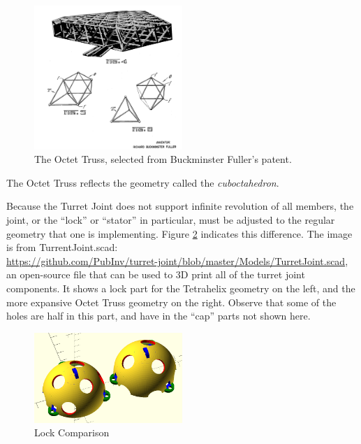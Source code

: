 \documentclass[11pt]{article}
\begin{document}
\begin{figure}[H]
  \centering
    \includegraphics[width=0.5\textwidth]{figures/OctetTrussSelection.png}
    \caption[The Octet Truss]{The Octet Truss, selected from Buckminster Fuller's patent.}
      \label{octet-truss-patent}
\end{figure}

The Octet Truss reflects the geometry called the \emph{cuboctahedron}.

Because the Turret Joint does not support infinite revolution of all members, the joint, or the ``lock'' or ``stator'' in particular,
must be adjusted to the regular geometry that one is implementing.  Figure \ref{lockcomparison} indicates this difference.
The image is from TurrentJoint.scad:\\
\href{https://github.com/PubInv/turret-joint/blob/master/Models/TurretJoint.scad}{https://github.com/PubInv/turret-joint/blob/master/Models/TurretJoint.scad}, an
open-source file that can be used to 3D print all of the turret joint components.
It shows a lock part for the Tetrahelix geometry
on the left, and the more expansive Octet Truss geometry on the right. Observe that some of the holes are half in this part,
and have in the ``cap'' parts not shown here.

\begin{figure}[H]
  \centering
    \includegraphics[width=0.5\textwidth]{figures/TetrahelixLockVsOctetTrussLock.png}
    \caption[Lock Comparison]{Lock Comparison}
      \label{lockcomparison}
\end{figure}
\end{document}
